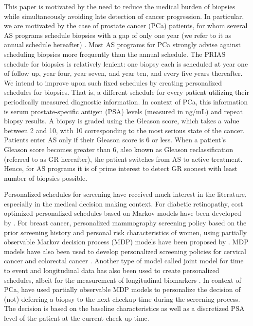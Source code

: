 This paper is motivated by the need to reduce the medical burden of biopsies while simultaneously avoiding late detection of cancer progression. In particular, we are motivated by the case of prostate cancer (PCa) patients, for whom several AS programs schedule biopsies with a gap of only one year (we refer to it as annual schedule hereafter) \citep{tosoian2011active,welty2015extended}. Most AS programs for PCa strongly advise against scheduling biopsies more frequently than the annual schedule. The PRIAS schedule for biopsies is relatively lenient: one biopsy each is scheduled at year one of follow up, year four, year seven, and year ten, and every five years thereafter. We intend to improve upon such fixed schedules by creating personalized schedules for biopsies. That is, a different schedule for every patient utilizing their periodically measured diagnostic information. In context of PCa, this information is serum prostate-specific antigen (PSA) levels (measured in ng/mL) and repeat biopsy results. A biopsy is graded using the Gleason score, which takes a value between 2 and 10, with 10 corresponding to the most serious state of the cancer. Patients enter AS only if their Gleason score is 6 or less. When a patient's Gleason score becomes greater than 6, also known as Gleason reclassification (referred to as GR hereafter), the patient switches from AS to active treatment. Hence, for AS programs it is of prime interest to detect GR soonest with least number of biopsies possible.

Personalized schedules for screening have received much interest in the literature, especially in the medical decision making context. For diabetic retinopathy, cost optimized personalized schedules based on Markov models have been developed by \citet{bebu2017OptimalScreening}. For breast cancer, personalized mammography screening policy based on the prior screening history and personal risk characteristics of women, using partially observable Markov decision process (MDP) models have been proposed by \citet*{ayer2012or}. MDP models have also been used to develop personalized screening policies for cervical cancer \citep*{akhavan2017markov} and colorectal cancer \citep*{erenay2014optimizing}. Another type of model called joint model for time to event and longitudinal data \citep{tsiatis2004joint,rizopoulos2012joint} has also been used to create personalized schedules, albeit for the measurement of longitudinal biomarkers \citep{drizopoulosPersScreening}. In context of PCa, \citet{zhang2012optimization} have used partially observable MDP models to personalize the decision of (not) deferring a biopsy to the next checkup time during the screening process. The decision is based on the baseline characteristics as well as a discretized PSA level of the patient at the current check up time.

